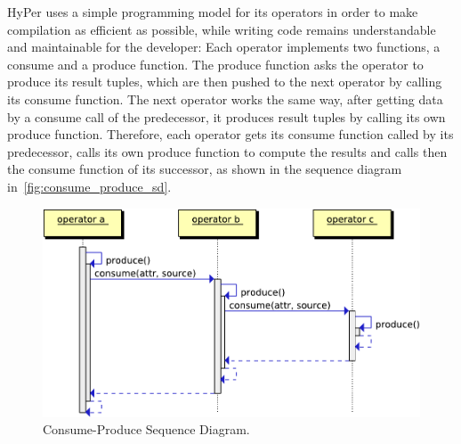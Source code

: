 HyPer uses a simple programming model for its operators in order to make  compilation as efficient as possible, while writing code remains understandable and maintainable for the developer: Each operator implements two functions, a consume and a produce function. The produce function asks the operator to produce its result tuples, which are then pushed to the next operator by calling its consume function. The next operator works the same way, after getting data by a consume call of the predecessor, it produces result tuples by calling its own produce function. Therefore, each operator gets its consume function called by its predecessor, calls its own produce function to compute the results and calls then the consume function of its successor, as shown in the sequence diagram in~\autoref{fig:consume_produce_sd}.


\begin{figure}[htsb]
  \centering
  \includegraphics[scale=0.6]{figures/consume_produce}
  \caption[Consume-Produce Sequence Diagram]{Consume-Produce Sequence Diagram.}\label{fig:consume_produce_sd}
\end{figure}



